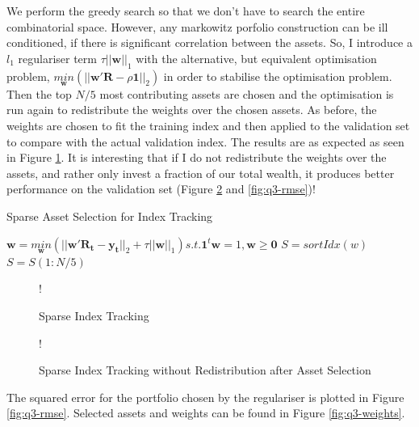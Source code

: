 \documentclass[11pt]{article}
\begin{document}
We perform the greedy search so that we don't have to search the entire combinatorial space. However, any markowitz
porfolio construction can be ill conditioned, if there is significant correlation between the assets. So, I introduce
a $l_1$ regulariser term $\tau||\bm{w}||_1$ with the alternative, but equivalent optimisation problem, 
$\underset{\bm{w}}{min}(||\bm{w}'\bm{R} - \rho\bm{1}||_2)$ in order to stabilise the optimisation problem. Then the top
$N/5$ most contributing assets are chosen and the optimisation is run again to redistribute the weights over the 
chosen assets. As before, the weights are chosen to fit the training index and then applied to the validation set
to compare with the actual validation index. The results are as expected as seen in Figure \ref{fig:q3-sparse}.
It is interesting that if I do not redistribute the weights over the assets, and rather only invest a fraction of
our total wealth, it produces better performance on the validation set (Figure \ref{fig:q3-sparse-no-distribution} and \ref{fig:q3-rmse})!\\

\begin{algorithm}[H]
\caption{Sparse Asset Selection for Index Tracking}
\label{alg:sparse-index}
\begin{algorithmic}

\State $\bm{w} = \underset{\bm{w}}{min}(||\bm{w}'\bm{R_t} - \bm{y_t}||_2 + \tau||\bm{w}||_1) s.t. \bm{1}^t\bm{w} = 1, \bm{w} \geq \bm{0}$
\State $S = sortIdx(w)$
\State $S = S(1:N/5)$

\end{algorithmic}
\end{algorithm}

\begin{figure}[!h]
   \vspace{-0.5cm}
	\centering 
 	 {!} { }
    \caption{Sparse Index Tracking}
	\label{fig:q3-sparse}
\end{figure}

\begin{figure}[!h]
	\vspace{-0.5cm}
   \centering 
 	 {!} { }
    \caption{Sparse Index Tracking without Redistribution after Asset Selection}
	\label{fig:q3-sparse-no-distribution}
	\vspace{-0.5cm}
\end{figure}

The squared error for the portfolio chosen by the regulariser is plotted in Figure \ref{fig:q3-rmse}. Selected assets and weights can be found in Figure \ref{fig:q3-weights}.\\
\end{document}
